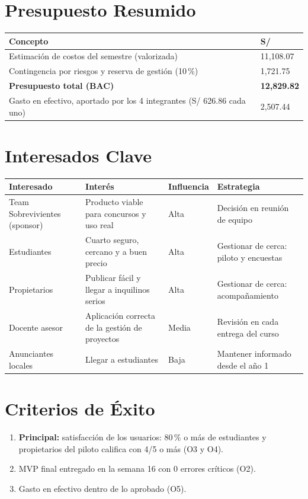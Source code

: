 \documentclass[11pt,a4paper]{article}
\begin{document}
\section{Presupuesto Resumido}
{\small
\noindent\begin{tabularx}{\textwidth}{@{}L Q{3.0cm}@{}}
\toprule
{}
\textbf{Concepto} & \textbf{S/} \\
\midrule
Estimación de costos del semestre (valorizada) & 11,108.07 \\
Contingencia por riesgos y reserva de gestión (10\,\%) & 1,721.75 \\
\textbf{Presupuesto total (BAC)} & \textbf{12,829.82} \\
Gasto en efectivo, aportado por los 4 integrantes (S/ 626.86 cada uno) & 2,507.44 \\
\bottomrule
\end{tabularx}
}

\section{Interesados Clave}
{\small
\noindent\begin{tabularx}{\textwidth}{@{}P{3.4cm} L C{1.6cm} L@{}}
\toprule
{}
\textbf{Interesado} & \textbf{Interés} & \textbf{Influencia} & \textbf{Estrategia} \\
\midrule
Team Sobrevivientes (sponsor) & Producto viable para concursos y uso real & Alta & Decisión en reunión de equipo \\
Estudiantes & Cuarto seguro, cercano y a buen precio & Alta & Gestionar de cerca: piloto y encuestas \\
Propietarios & Publicar fácil y llegar a inquilinos serios & Alta & Gestionar de cerca: acompañamiento \\
Docente asesor & Aplicación correcta de la gestión de proyectos & Media & Revisión en cada entrega del curso \\
Anunciantes locales & Llegar a estudiantes & Baja & Mantener informado desde el año 1 \\
\bottomrule
\end{tabularx}
}

\section{Criterios de Éxito}
\begin{enumerate}[leftmargin=*]
    \item \textbf{Principal:} satisfacción de los usuarios: 80\,\% o más de estudiantes y propietarios del piloto califica con 4/5 o más (O3 y O4).
    \item MVP final entregado en la semana 16 con 0 errores críticos (O2).
    \item Gasto en efectivo dentro de lo aprobado (O5).
\end{enumerate}
\end{document}

